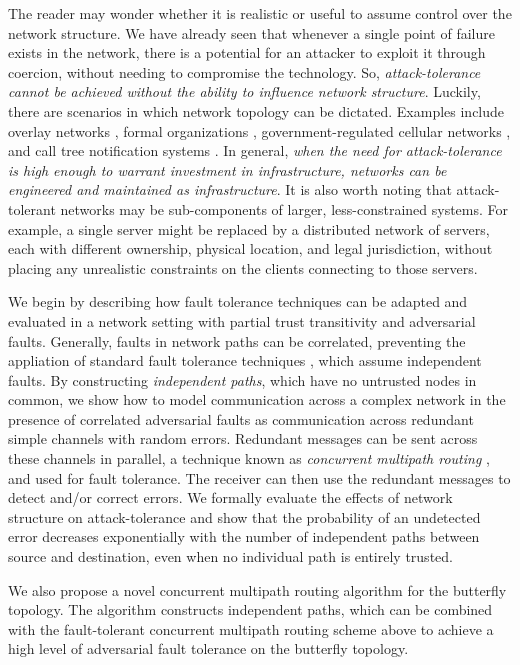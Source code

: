 \documentclass{sig-alternate-05-2015}
\begin{document}
The reader may wonder whether it is realistic or useful to assume control over
the network structure.
We have already seen that whenever a single point of failure exists in the network,
there is a potential for an attacker to exploit it through coercion,
without needing to compromise the technology.
So, {\em attack-tolerance cannot be achieved without the ability to influence
network structure}.
Luckily, there are scenarios in which network topology can be dictated.
Examples include overlay networks
\cite{lua_survey_2005, korzun_structured_2013},
formal organizations \cite{mohr_explaining_1982},
government-regulated cellular networks \cite{walker_mass_2012},
and call tree notification systems \cite{nickerson_thinking_2010}.
In general,
{\em when the need for attack-tolerance is high enough to warrant investment
in infrastructure, networks can be engineered and maintained as infrastructure}.
It is also worth noting that attack-tolerant networks may be sub-components of
larger, less-constrained systems.
For example, a single server might be replaced by a distributed network of servers,
each with different ownership, physical location, and legal jurisdiction,
without placing any unrealistic constraints on the clients connecting to
those servers.

We begin by describing how fault tolerance techniques can be adapted and
evaluated in a network setting with partial trust transitivity and
adversarial faults.
Generally, faults in network paths can be correlated,
preventing the appliation of standard fault tolerance techniques
\cite{avizienis_basic_2004, von_neumann_probabilistic_1956},
which assume independent faults.
By constructing {\em independent paths},
which have no untrusted nodes in common,
we show how to model communication across a complex network in the presence
of correlated adversarial faults as communication across redundant
simple channels with random errors.
Redundant messages can be sent across these channels in parallel,
a technique known as {\em concurrent multipath routing}
\cite{zin_survey_2015, qadir_exploiting_2015, khiani_comparative_2013},
and used for fault tolerance.
The receiver can then use the redundant messages to detect and/or correct
errors.
We formally evaluate the
effects of network structure on attack-tolerance and show that the probability
of an undetected error decreases exponentially with the number of
independent paths between source and destination,
even when no individual path is entirely trusted.

We also propose a novel concurrent multipath routing algorithm for the butterfly
topology.
The algorithm constructs independent paths,
which can be combined with the fault-tolerant concurrent multipath routing
scheme above to
achieve a high level of adversarial fault tolerance on the butterfly topology.
\end{document}
